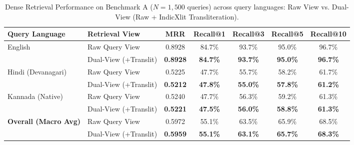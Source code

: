\begin{table}[t]
\centering
\caption{Dense Retrieval Performance on Benchmark A ($N=1,500$ queries) across query languages: Raw View vs. Dual-View (Raw + IndicXlit Transliteration).}
\label{tab:retrieval}
\begin{tabular}{llccccc}
\toprule
\textbf{Query Language} & \textbf{Retrieval View} & \textbf{MRR} & \textbf{Recall@1} & \textbf{Recall@3} & \textbf{Recall@5} & \textbf{Recall@10} \\
\midrule
\multirow{2}{*}{English} & Raw Query View & 0.8928 & 84.7\% & 93.7\% & 95.0\% & 96.7\% \\
 & Dual-View (+Translit) & \textbf{0.8928} & \textbf{84.7\%} & \textbf{93.7\%} & \textbf{95.0\%} & \textbf{96.7\%} \\
\midrule
\multirow{2}{*}{Hindi (Devanagari)} & Raw Query View & 0.5225 & 47.7\% & 55.7\% & 58.2\% & 61.7\% \\
 & Dual-View (+Translit) & \textbf{0.5212} & \textbf{47.8\%} & \textbf{55.0\%} & \textbf{57.8\%} & \textbf{61.2\%} \\
\midrule
\multirow{2}{*}{Kannada (Native)} & Raw Query View & 0.5240 & 47.7\% & 56.3\% & 59.2\% & 61.3\% \\
 & Dual-View (+Translit) & \textbf{0.5221} & \textbf{47.5\%} & \textbf{56.0\%} & \textbf{58.8\%} & \textbf{61.3\%} \\
\midrule
\multirow{2}{*}{\textbf{Overall (Macro Avg)}} & Raw Query View & 0.5972 & 55.1\% & 63.5\% & 65.9\% & 68.5\% \\
 & Dual-View (+Translit) & \textbf{0.5959} & \textbf{55.1\%} & \textbf{63.1\%} & \textbf{65.7\%} & \textbf{68.3\%} \\
\bottomrule
\end{tabular}
\end{table}